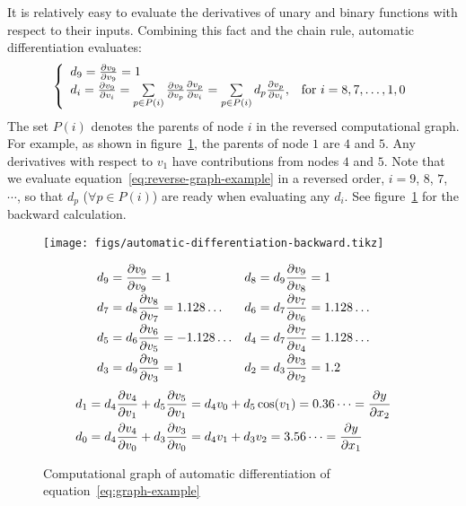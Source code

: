 It is relatively easy to evaluate the derivatives of unary and binary functions with respect to their inputs.
Combining this fact and the chain rule, automatic differentiation evaluates:
\begin{equation}\label{eq:reverse-graph-example}
    \left\{
        \begin{array}{ll}
            d_9 = \frac{\partial v_9}{\partial v_9} = 1 & \\
            d_i = \frac{\partial v_9}{\partial v_i}
                = \sum\limits_{p\in P(i)}\frac{\partial v_9}{\partial v_p}\frac{\partial v_p}{\partial v_i}
                = \sum\limits_{p\in P(i)}d_p\frac{\partial v_p}{\partial v_i}, & \text{for }i=8, 7, \ldots, 1, 0
        \end{array}
    \right.
\end{equation}
The set $P(i)$ denotes the parents of node $i$ in the reversed computational graph.
For example, as shown in figure~\ref{fig:automatic-differentiation-backward}, the parents of node $1$ are $4$ and $5$.
Any derivatives with respect to $v_1$ have contributions from nodes $4$ and $5$.
Note that we evaluate equation~\ref{eq:reverse-graph-example} in a reversed order, $i=9$, $8$, $7$, $\cdots$, so that $d_p$ ($\forall p\in P(i)$) are ready when evaluating any $d_i$.
See figure~\ref{fig:automatic-differentiation-backward} for the backward calculation.
\begin{figure}[hbt!]
    \begin{minipage}{0.4\textwidth}
        \texttt{[image: figs/automatic-differentiation-backward.tikz]}
    \end{minipage}%
    \begin{minipage}{0.5\textwidth}
        \scriptsize
        \singlespacing
        \begin{equation*}
            \begin{aligned}
                d_9& = \frac{\partial v_9}{\partial v_9} = 1 & d_8& = d_9 \frac{\partial v_9}{\partial v_8} = 1 \\[-2pt]
                d_7& = d_8 \frac{\partial v_8}{\partial v_7} = 1.128\dots & d_6& = d_7 \frac{\partial v_7}{\partial v_6} = 1.128\dots \\[-2pt]
                d_5& = d_6 \frac{\partial v_6}{\partial v_5} = -1.128\dots & d_4& = d_7 \frac{\partial v_7}{\partial v_4} = 1.128\dots \\[-2pt]
                d_3& = d_9 \frac{\partial v_9}{\partial v_3} = 1 & d_2& = d_3 \frac{\partial v_3}{\partial v_2} = 1.2
            \end{aligned}
        \end{equation*}%
        \begin{equation*}
            \begin{aligned}
                d_1& = d_4 \frac{\partial v_4}{\partial v_1} + d_5 \frac{\partial v_5}{\partial v_1} = d_4v_0 + d_5\cos(v_1) = 0.36\dots = \frac{\partial y}{\partial x_2} \\
                d_0& = d_4 \frac{\partial v_4}{\partial v_0} + d_3 \frac{\partial v_3}{\partial v_0} = d_4v_1+d_3v_2 = 3.56\dots = \frac{\partial y}{\partial x_1}
            \end{aligned}
        \end{equation*}
    \end{minipage}
    \caption{Computational graph of automatic differentiation of equation~\ref{eq:graph-example}}%
    \label{fig:automatic-differentiation-backward}
\end{figure}

